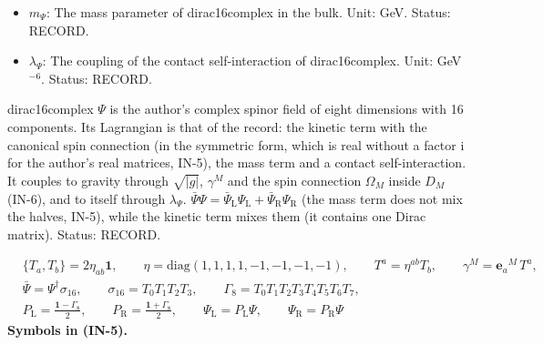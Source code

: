 \documentclass[
  10pt,
]{article}
\begin{document}
\begin{itemize}
  \(D_M,\ D_\mu\): The covariant derivative: on dirac16complex
  \(D_M = \partial_M + \Omega_M\) (with
  \(D_M\bar\Psi = \partial_M\bar\Psi - \bar\Psi\Omega_M\)); on the
  fields of the fold the gauge and spin covariant derivative \(D_\mu\)
  (the partial derivative plus the spin connection of the fold and the
  gauge fields times their couplings and generators);
  \(D^\mu = \hat h^{\mu\nu}D_\nu\); on an adjoint field
  \((D_\mu X)^A = \partial_\mu X^A + g_3f^{ABC}G^B_\mu X^C\) (likewise
  for \(SU(2)\) with \(g_2\epsilon^{IJK}\)). Unit: 1/length. Status:
  STANDARD.
\item
  \(m_\Psi\): The mass parameter of dirac16complex in the bulk. Unit:
  GeV. Status: RECORD.
\item
  \(\lambda_\Psi\): The coupling of the contact self-interaction of
  dirac16complex. Unit: GeV\(^{-6}\). Status: RECORD.
\end{itemize}

dirac16complex \(\Psi\) is the author's complex spinor field of eight
dimensions with 16 components. Its Lagrangian is that of the record: the
kinetic term with the canonical spin connection (in the symmetric form,
which is real without a factor \(\mathrm{i}\) for the author's real
matrices, IN-5), the mass term and a contact self-interaction. It
couples to gravity through \(\sqrt{\lvert g\rvert}\), \(\gamma^M\) and
the spin connection \(\Omega_M\) inside \(D_M\) (IN-6), and to itself
through \(\lambda_\Psi\).
\(\bar\Psi\Psi = \bar\Psi_{\mathrm{L}}\Psi_{\mathrm{L}} + \bar\Psi_{\mathrm{R}}\Psi_{\mathrm{R}}\)
(the mass term does not mix the halves, IN-5), while the kinetic term
mixes them (it contains one Dirac matrix). Status: RECORD.

\[
\begin{aligned}
&\{T_a, T_b\} = 2\eta_{ab}\mathbf{1},\qquad \eta = \mathrm{diag}(1, 1, 1, 1, -1, -1, -1, -1),\qquad T^a = \eta^{ab}T_b,
 \qquad \gamma^M = \mathbf{e}_a{}^M\,T^a,\\
&\bar\Psi = \Psi^\dagger\sigma_{16},\qquad \sigma_{16} = T_0T_1T_2T_3,\qquad \Gamma_8 = T_0T_1T_2T_3T_4T_5T_6T_7,\\
&P_{\mathrm{L}} = \frac{\mathbf{1} - \Gamma_8}{2},\qquad P_{\mathrm{R}} = \frac{\mathbf{1} + \Gamma_8}{2},\qquad
 \Psi_{\mathrm{L}} = P_{\mathrm{L}}\Psi,\qquad \Psi_{\mathrm{R}} = P_{\mathrm{R}}\Psi
\end{aligned} \tag{IN-5}
\] \textbf{Symbols in (IN-5).}
\end{document}
